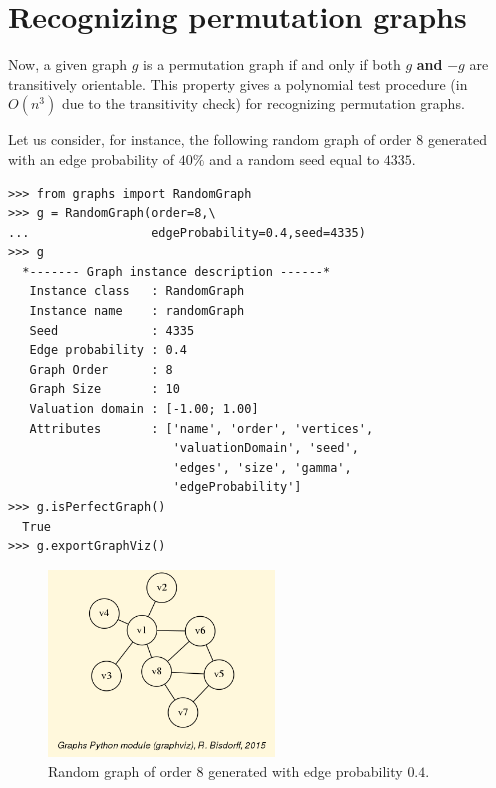 \section{Recognizing permutation graphs}
\label{sec:25.4}

Now, a given graph $g$ is a permutation graph if and only if both $g$ \textbf{and} $-g$ are transitively orientable. This  property gives a polynomial test procedure (in $O(n^3)$ due to the transitivity check) for recognizing permutation graphs.

Let us consider, for instance, the following random graph of order 8 generated with an edge probability of $40\%$ and a random seed equal to $4335$.
\begin{lstlisting}
>>> from graphs import RandomGraph
>>> g = RandomGraph(order=8,\
...                 edgeProbability=0.4,seed=4335)
>>> g
  *------- Graph instance description ------*
   Instance class   : RandomGraph
   Instance name    : randomGraph
   Seed             : 4335
   Edge probability : 0.4
   Graph Order      : 8
   Graph Size       : 10
   Valuation domain : [-1.00; 1.00]
   Attributes       : ['name', 'order', 'vertices',
                       'valuationDomain', 'seed',
                       'edges', 'size', 'gamma',
                       'edgeProbability']
>>> g.isPerfectGraph()
  True
>>> g.exportGraphViz()
\end{lstlisting}		    
\begin{figure}[h]
\sidecaption
\includegraphics[width=6cm]{Figures/randomGraph4335.png}
\caption{Random graph of order 8 generated with edge probability $0.4$.} 
\label{fig:25.8}       %
\end{figure}

